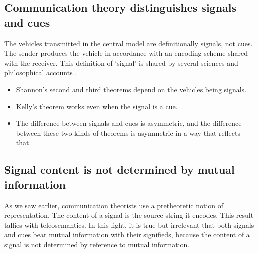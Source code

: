 \subsection{Communication theory distinguishes signals and cues}

The vehicles transmitted in the central model are definitionally signals, not cues.
The sender produces the vehicle in accordance with an encoding scheme shared with the receiver.
This definition of `signal' is shared by several sciences \citep{shannon1948mathematicala,maynardsmith2003animal} and philosophical accounts \citep[$\S$6]{millikan2004varieties} \citep{bergstrom2011transmission}.

\begin{itemize}
    \item Shannon's second and third theorems depend on the vehicles being signals.
    \item Kelly's theorem works even when the signal is a cue.
    \item The difference between signals and cues is asymmetric, and the difference between these two kinds of theorems is asymmetric in a way that reflects that.
\end{itemize}

\subsection{Signal content is not determined by mutual information}

As we saw earlier, communication theorists use a pretheoretic notion of representation.
The content of a signal is the source string it encodes.
This result tallies with teleosemantics.
In this light, it is true but irrelevant that both signals and cues bear mutual information with their signifieds, because the content of a signal is not determined by reference to mutual information.

